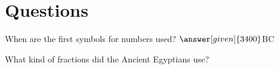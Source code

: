 \documentclass{ximera}
\begin{document}
\section{Questions}



\begin{question}
When are the first symbols for numbers used?  $\answer[given]{3400}$BC
\end{question}



\begin{question}
What kind of fractions did the Ancient Egyptians use?
\begin{multipleChoice}
\end{multipleChoice}
\end{question}



\end{document}
